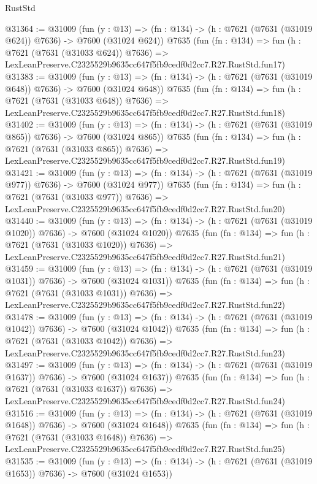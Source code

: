 \begin{lexlean}{RustStd}
\begin{coremodule}
@31364 := @31009
    (fun (y : @13) => (fn : @134) -> (h : @7621 (@7631 (@31019 @624)) @7636) -> @7600 (@31024 @624))
    @7635
    (fun (fn : @134) =>
    fun (h : @7621 (@7631 (@31033 @624)) @7636) =>
    LexLeanPreserve.C2325529b9635cc647f5fb9cedf0d2cc7.R27.RustStd.fun17)
@31383 := @31009
    (fun (y : @13) => (fn : @134) -> (h : @7621 (@7631 (@31019 @648)) @7636) -> @7600 (@31024 @648))
    @7635
    (fun (fn : @134) =>
    fun (h : @7621 (@7631 (@31033 @648)) @7636) =>
    LexLeanPreserve.C2325529b9635cc647f5fb9cedf0d2cc7.R27.RustStd.fun18)
@31402 := @31009
    (fun (y : @13) => (fn : @134) -> (h : @7621 (@7631 (@31019 @865)) @7636) -> @7600 (@31024 @865))
    @7635
    (fun (fn : @134) =>
    fun (h : @7621 (@7631 (@31033 @865)) @7636) =>
    LexLeanPreserve.C2325529b9635cc647f5fb9cedf0d2cc7.R27.RustStd.fun19)
@31421 := @31009
    (fun (y : @13) => (fn : @134) -> (h : @7621 (@7631 (@31019 @977)) @7636) -> @7600 (@31024 @977))
    @7635
    (fun (fn : @134) =>
    fun (h : @7621 (@7631 (@31033 @977)) @7636) =>
    LexLeanPreserve.C2325529b9635cc647f5fb9cedf0d2cc7.R27.RustStd.fun20)
@31440 := @31009
    (fun (y : @13) =>
    (fn : @134) -> (h : @7621 (@7631 (@31019 @1020)) @7636) -> @7600 (@31024 @1020))
    @7635
    (fun (fn : @134) =>
    fun (h : @7621 (@7631 (@31033 @1020)) @7636) =>
    LexLeanPreserve.C2325529b9635cc647f5fb9cedf0d2cc7.R27.RustStd.fun21)
@31459 := @31009
    (fun (y : @13) =>
    (fn : @134) -> (h : @7621 (@7631 (@31019 @1031)) @7636) -> @7600 (@31024 @1031))
    @7635
    (fun (fn : @134) =>
    fun (h : @7621 (@7631 (@31033 @1031)) @7636) =>
    LexLeanPreserve.C2325529b9635cc647f5fb9cedf0d2cc7.R27.RustStd.fun22)
@31478 := @31009
    (fun (y : @13) =>
    (fn : @134) -> (h : @7621 (@7631 (@31019 @1042)) @7636) -> @7600 (@31024 @1042))
    @7635
    (fun (fn : @134) =>
    fun (h : @7621 (@7631 (@31033 @1042)) @7636) =>
    LexLeanPreserve.C2325529b9635cc647f5fb9cedf0d2cc7.R27.RustStd.fun23)
@31497 := @31009
    (fun (y : @13) =>
    (fn : @134) -> (h : @7621 (@7631 (@31019 @1637)) @7636) -> @7600 (@31024 @1637))
    @7635
    (fun (fn : @134) =>
    fun (h : @7621 (@7631 (@31033 @1637)) @7636) =>
    LexLeanPreserve.C2325529b9635cc647f5fb9cedf0d2cc7.R27.RustStd.fun24)
@31516 := @31009
    (fun (y : @13) =>
    (fn : @134) -> (h : @7621 (@7631 (@31019 @1648)) @7636) -> @7600 (@31024 @1648))
    @7635
    (fun (fn : @134) =>
    fun (h : @7621 (@7631 (@31033 @1648)) @7636) =>
    LexLeanPreserve.C2325529b9635cc647f5fb9cedf0d2cc7.R27.RustStd.fun25)
@31535 := @31009
    (fun (y : @13) =>
    (fn : @134) -> (h : @7621 (@7631 (@31019 @1653)) @7636) -> @7600 (@31024 @1653))

\end{coremodule}
\end{lexlean}
